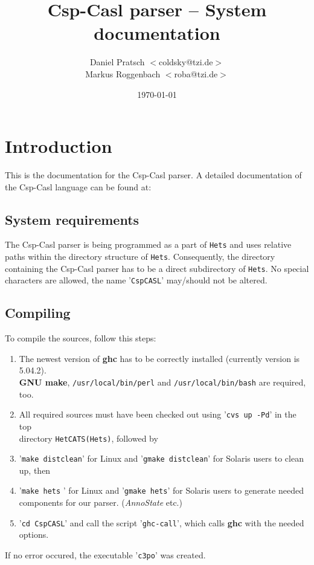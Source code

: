 \documentclass[11pt, twoside]{article}
\author{Daniel Pratsch $<$coldsky@tzi.de$>$\\
         Markus Roggenbach $<$roba@tzi.de$>$}
\title{{\bf {\sc Csp-Casl} parser -- System documentation}}
\date{\today}
\begin{document}
\maketitle

\tableofcontents

\section{Introduction}

This is the documentation for the {\sc Csp-Casl} parser. A detailed documentation of the {\sc Csp-Casl} language can be found at:

\subsection{System requirements}

The {\sc Csp-Casl} parser is being programmed as a part of {\tt Hets} and uses relative paths within the directory structure of {\tt Hets}. 
Consequently, the directory containing the {\sc Csp-Casl} parser has to be a direct subdirectory of {\tt Hets}. No special characters 
are allowed, the name '{\tt CspCASL}' may/should not be altered. 

\subsection{Compiling}

To compile the sources, follow this steps:
\begin{enumerate}
\item The newest version of {\bf ghc} has to be correctly installed (currently version is 5.04.2).\\
{\bf GNU make}, {\tt /usr/local/bin/perl} and {\tt /usr/local/bin/bash} are required, too.
\item All required sources must have been checked out using '{\tt cvs up -Pd}' in the top\\
directory {\tt HetCATS(Hets)}, followed by 
\item '{\tt make distclean}' for Linux and '{\tt gmake distclean}' for Solaris users to clean up, then
\item '{\tt make hets} ' for Linux and '{\tt gmake hets}' for Solaris users to generate needed\\
components for our parser. ({\it AnnoState} etc.)
\item '{\tt cd CspCASL}' and call the script '{\tt ghc-call}', which calls {\bf ghc} with the needed options.
\end{enumerate}
If no error occured, the executable '{\tt c3po}' was created.   
\end{document}
